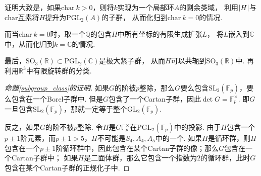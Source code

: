 证明大致是，如果$\mathrm{char}\ k>0$，则将$k$实现为一个局部环$A$的剩余类域，
利用$\left|H\right|$与$\mathrm{char}$互素将$H$提升为$\mathrm{PGL}_2(A)$的子群，
从而化归到$\mathrm{char}\ k=0$的情况.

而当$\mathrm{char}\ k=0$时，取一个$\mathbb{Q}$的包含$H$中所有坐标的有限生成扩张$L$，
将$L$嵌入到$\mathbb{C}$中，从而化归到$k=\mathbb{C}$的情况.

最后，$\mathrm{SO}_3(\mathbb{R})\subset \mathrm{PGL}_2(\mathbb{C})$是极大紧子群，
从而$H$可以共轭到$\mathrm{SO}_3(\mathbb{R})$中. 再利用$\mathbb{R}^3$中有限旋转群的分类.

\begin{proof}[命题\ref{subgroup_class}的证明]
    如果$G$的阶被$p$整除，那么$G$要么包含$\mathrm{SL}_2(\mathbb{F}_p)$，要么包含在一个Borel子群中.
    但是$G$包含了一个Cartan子群，因此$\det G = \mathbb{F}_{p}^{\times}$.
    即$G$一旦包含$\mathrm{SL}_2(\mathbb{F}_p)$，那就一定等于整个$\mathrm{GL}_2(\mathbb{F}_p)$.

    反之，如果$G$的阶不被$p$整除. 令$H$是$G\mathbb{F}_{p}^{\times}$在$\mathrm{PGL}_2(\mathbb{F}_p)$中的投影.
    由于$H$包含一个$p\pm 1$阶元素，而$p\pm 1 > 5$，$H$不可能是$S_4,A_4,A_5$中的一个.
    如果$H$是循环群，则$H$包含在一个$p\pm 1$阶循环群中，因此包含在某个Cartan子群的像；那么$G$包含在一个Cartan子群中；
    如果$H$是二面体群，那么它包含一个指数为$2$的循环群，此时$G$包含在某个Cartan子群的正规化子中.
\end{proof}
